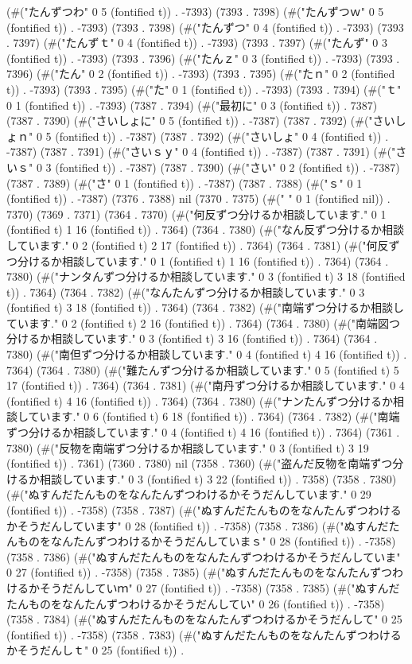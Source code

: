 (#("たんずつわ" 0 5 (fontified t)) . -7393) (7393 . 7398) (#("たんずつｗ" 0 5 (fontified t)) . -7393) (7393 . 7398) (#("たんずつ" 0 4 (fontified t)) . -7393) (7393 . 7397) (#("たんずｔ" 0 4 (fontified t)) . -7393) (7393 . 7397) (#("たんず" 0 3 (fontified t)) . -7393) (7393 . 7396) (#("たんｚ" 0 3 (fontified t)) . -7393) (7393 . 7396) (#("たん" 0 2 (fontified t)) . -7393) (7393 . 7395) (#("たｎ" 0 2 (fontified t)) . -7393) (7393 . 7395) (#("た" 0 1 (fontified t)) . -7393) (7393 . 7394) (#("ｔ" 0 1 (fontified t)) . -7393) (7387 . 7394) (#("最初に" 0 3 (fontified t)) . 7387) (7387 . 7390) (#("さいしょに" 0 5 (fontified t)) . -7387) (7387 . 7392) (#("さいしょｎ" 0 5 (fontified t)) . -7387) (7387 . 7392) (#("さいしょ" 0 4 (fontified t)) . -7387) (7387 . 7391) (#("さいｓｙ" 0 4 (fontified t)) . -7387) (7387 . 7391) (#("さいｓ" 0 3 (fontified t)) . -7387) (7387 . 7390) (#("さい" 0 2 (fontified t)) . -7387) (7387 . 7389) (#("さ" 0 1 (fontified t)) . -7387) (7387 . 7388) (#("ｓ" 0 1 (fontified t)) . -7387) (7376 . 7388) nil (7370 . 7375) (#(" " 0 1 (fontified nil)) . 7370) (7369 . 7371) (7364 . 7370) (#("何反ずつ分けるか相談しています." 0 1 (fontified t) 1 16 (fontified t)) . 7364) (7364 . 7380) (#("なん反ずつ分けるか相談しています." 0 2 (fontified t) 2 17 (fontified t)) . 7364) (7364 . 7381) (#("何反ずつ分けるか相談しています." 0 1 (fontified t) 1 16 (fontified t)) . 7364) (7364 . 7380) (#("ナンタんずつ分けるか相談しています." 0 3 (fontified t) 3 18 (fontified t)) . 7364) (7364 . 7382) (#("なんたんずつ分けるか相談しています." 0 3 (fontified t) 3 18 (fontified t)) . 7364) (7364 . 7382) (#("南端ずつ分けるか相談しています." 0 2 (fontified t) 2 16 (fontified t)) . 7364) (7364 . 7380) (#("南端図つ分けるか相談しています." 0 3 (fontified t) 3 16 (fontified t)) . 7364) (7364 . 7380) (#("南但ずつ分けるか相談しています." 0 4 (fontified t) 4 16 (fontified t)) . 7364) (7364 . 7380) (#("難たんずつ分けるか相談しています." 0 5 (fontified t) 5 17 (fontified t)) . 7364) (7364 . 7381) (#("南丹ずつ分けるか相談しています." 0 4 (fontified t) 4 16 (fontified t)) . 7364) (7364 . 7380) (#("ナンたんずつ分けるか相談しています." 0 6 (fontified t) 6 18 (fontified t)) . 7364) (7364 . 7382) (#("南端ずつ分けるか相談しています." 0 4 (fontified t) 4 16 (fontified t)) . 7364) (7361 . 7380) (#("反物を南端ずつ分けるか相談しています." 0 3 (fontified t) 3 19 (fontified t)) . 7361) (7360 . 7380) nil (7358 . 7360) (#("盗んだ反物を南端ずつ分けるか相談しています." 0 3 (fontified t) 3 22 (fontified t)) . 7358) (7358 . 7380) (#("ぬすんだたんものをなんたんずつわけるかそうだんしています." 0 29 (fontified t)) . -7358) (7358 . 7387) (#("ぬすんだたんものをなんたんずつわけるかそうだんしています" 0 28 (fontified t)) . -7358) (7358 . 7386) (#("ぬすんだたんものをなんたんずつわけるかそうだんしていまｓ" 0 28 (fontified t)) . -7358) (7358 . 7386) (#("ぬすんだたんものをなんたんずつわけるかそうだんしていま" 0 27 (fontified t)) . -7358) (7358 . 7385) (#("ぬすんだたんものをなんたんずつわけるかそうだんしていｍ" 0 27 (fontified t)) . -7358) (7358 . 7385) (#("ぬすんだたんものをなんたんずつわけるかそうだんしてい" 0 26 (fontified t)) . -7358) (7358 . 7384) (#("ぬすんだたんものをなんたんずつわけるかそうだんして" 0 25 (fontified t)) . -7358) (7358 . 7383) (#("ぬすんだたんものをなんたんずつわけるかそうだんしｔ" 0 25 (fontified t)) . 